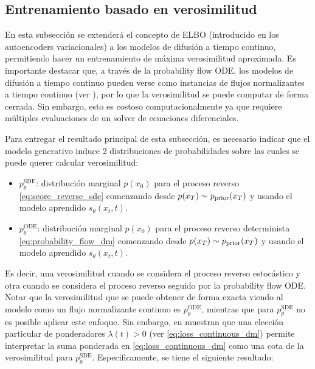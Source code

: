 \subsection{Entrenamiento basado en verosimilitud}
\label{dm/continuous_dm/likelihood}

En esta subsección se extenderá el concepto de ELBO (introducido en los autoencoders variacionales) a los modelos de difusión a tiempo continuo, permitiendo hacer un entrenamiento de máxima verosimilitud aproximada. Es importante destacar que, a través de la probability flow ODE, los modelos de difusión a tiempo continuo pueden verse como instancias de flujos normalizantes a tiempo continuo (ver \cite{chen2019neuralordinarydifferentialequations}), por lo que la verosimilitud se puede computar de forma cerrada. Sin embargo, esto es costoso computacionalmente ya que requiere múltiples evaluaciones de un solver de ecuaciones diferenciales.

Para entregar el resultado principal de esta subsección, es necesario indicar que el modelo generativo induce 2 distribuciones de probabilidades sobre las cuales se puede querer calcular verosimilitud:

\begin{itemize}
    \item $p_\theta^{\operatorname{SDE}}$: distribución marginal $p(x_0)$ para el proceso reverso \eqref{eq:score_reverse_sde} comenzando desde $p(x_T)\sim p_{\operatorname{prior}}(x_T)$ y usando el modelo aprendido $s_\theta(x_t,t)$.
    \item $p_\theta^{\operatorname{ODE}}$: distribución marginal $p(x_0)$ para el proceso reverso determinista \eqref{eq:probability_flow_dm} comenzando desde $p(x_T)\sim p_{\operatorname{prior}}(x_T)$ y usando el modelo aprendido $s_\theta(x_t,t)$.
\end{itemize}

Es decir, una verosimilitud cuando se considera el proceso reverso estocástico y otra cuando se considera el proceso reverso seguido por la probability flow ODE. Notar que la verosimilitud que se puede obtener de forma exacta viendo al modelo como un flujo normalizante continuo es $p_\theta^{\operatorname{ODE}}$, mientras que para $p_\theta^{\operatorname{SDE}}$ no es posible aplicar este enfoque. Sin embargo, en \cite{song2021maximumlikelihoodtrainingscorebased} muestran que una elección particular de ponderadores $\lambda(t)>0$ (ver \eqref{eq:loss_continuous_dm}) permite interpretar la suma ponderada en \eqref{eq:loss_continuous_dm} como una cota de la verosimilitud para $p_\theta^{\operatorname{SDE}}$. Especificamente, se tiene el siguiente resultado:

